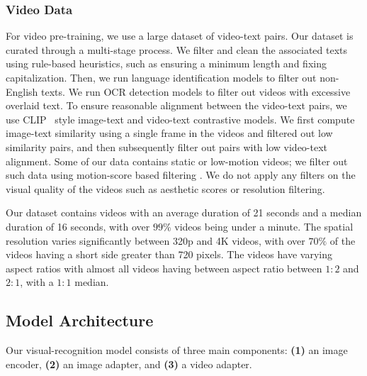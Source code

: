 \subsubsection{Video Data}
\label{subsubsection:vision_data_video}
For video pre-training, we use a large dataset of video-text pairs. Our dataset is curated through a multi-stage process. We filter and clean the associated texts using rule-based heuristics, such as ensuring a minimum length and fixing capitalization. Then, we run language identification models to filter out non-English texts. We run OCR detection models to filter out videos with excessive overlaid text. To ensure reasonable alignment between the video-text pairs, we use CLIP~\citep{radford2021learning} style image-text and video-text contrastive models. We first compute image-text similarity using a single frame in the videos and filtered out low similarity pairs, and then subsequently filter out pairs with low video-text alignment. Some of our data contains static or low-motion videos; we filter out such data using motion-score based filtering \citep{girdhar2023emu}. We do not apply any filters on the visual quality of the videos such as aesthetic scores or resolution filtering.

Our dataset contains videos with an average duration of 21 seconds and a median duration of 16 seconds, with over $99\%$ videos being under a minute. The spatial resolution varies significantly between 320p and 4K videos, with over $70\%$ of the videos having a short side greater than 720 pixels. The videos have varying aspect ratios with almost all videos having between aspect ratio between $1{:}2$ and $2{:}1$, with a $1{:}1$ median.

\subsection{Model Architecture}
\label{section:vision_model_architecture}
Our visual-recognition model consists of three main components: \textbf{(1)} an image encoder, \textbf{(2)} an image adapter, and \textbf{(3)} a video adapter.

